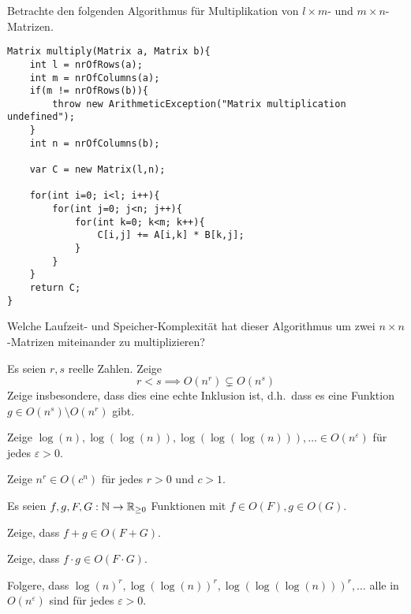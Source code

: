 
\begin{sheet}
    \begin{problem}
        Betrachte den folgenden Algorithmus für Multiplikation von $l\times m$- und $m\times n$-Matrizen.
        \begin{lstlisting}
Matrix multiply(Matrix a, Matrix b){
    int l = nrOfRows(a);
    int m = nrOfColumns(a);
    if(m != nrOfRows(b)){
        throw new ArithmeticException("Matrix multiplication undefined");
    }
    int n = nrOfColumns(b);

    var C = new Matrix(l,n);

    for(int i=0; i<l; i++){
        for(int j=0; j<n; j++){
            for(int k=0; k<m; k++){
                C[i,j] += A[i,k] * B[k,j];
            }
        }
    }
    return C;
}
        \end{lstlisting}

        Welche Laufzeit- und Speicher-Komplexität hat dieser Algorithmus um zwei $n\times n$-Matrizen miteinander zu multiplizieren?
    \end{problem}

    \begin{problem}[title={Ein paar übliche Komplexitätsklassen}]
        \begin{subproblem}
            Es seien $r,s$ reelle Zahlen. Zeige
            \[r<s \implies O(n^r) \subsetneq O(n^s)\]
            Zeige insbesondere, dass dies eine echte Inklusion ist, d.h.\ dass es eine Funktion $g\in O(n^s) \setminus O(n^r)$ gibt.
        \end{subproblem}
        \begin{subproblem}
            Zeige $\log(n),\log(\log(n)), \log(\log(\log(n))), \ldots \in O(n^\varepsilon)$ für jedes $\varepsilon>0$.
        \end{subproblem}
        \begin{subproblem}
            Zeige $n^r \in O(c^n)$ für jedes $r>0$ und $c>1$.
        \end{subproblem}
    \end{problem}

    \begin{problem}
        Es seien $f,g,F,G:\mathbb{N}\to\mathbb{R}_{\geq 0}$ Funktionen mit $f\in O(F), g\in O(G)$.
        \begin{subproblem}
            Zeige, dass $f+g\in O(F+G)$.
        \end{subproblem}
        \begin{subproblem}
            Zeige, dass $f\cdot g\in O(F\cdot G)$.
        \end{subproblem}
        \begin{subproblem}
            Folgere, dass $\log(n)^r, \log(\log(n))^r, \log(\log(\log(n)))^r, \ldots$ alle in $O(n^\varepsilon)$ sind für jedes $\varepsilon>0$.


\end{subproblem}
\end{problem}
\end{sheet}
